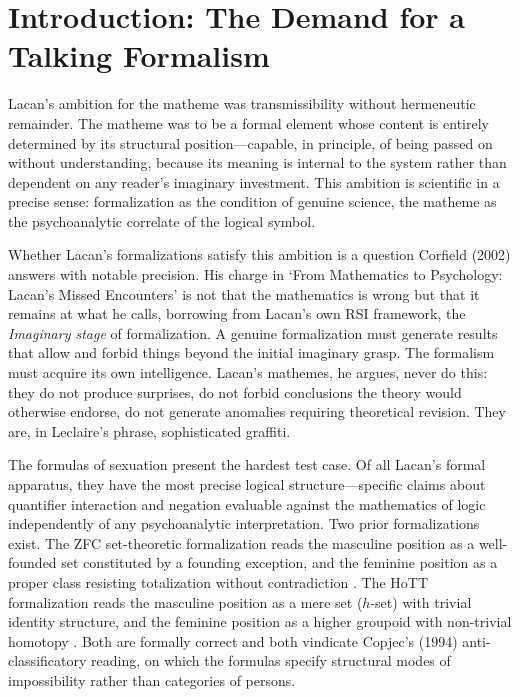 \documentclass[12pt]{article}
\theoremstyle{definition}
\theoremstyle{remark}
\begin{document}
\section{Introduction: The Demand for a Talking Formalism}

Lacan's ambition for the matheme was transmissibility without hermeneutic remainder. The matheme was to be a formal element whose content is entirely determined by its structural position---capable, in principle, of being passed on without understanding, because its meaning is internal to the system rather than dependent on any reader's imaginary investment. This ambition is scientific in a precise sense: formalization as the condition of genuine science, the matheme as the psychoanalytic correlate of the logical symbol.

Whether Lacan's formalizations satisfy this ambition is a question Corfield (2002) answers with notable precision. His charge in `From Mathematics to Psychology: Lacan's Missed Encounters' is not that the mathematics is wrong but that it remains at what he calls, borrowing from Lacan's own RSI framework, the \emph{Imaginary stage} of formalization. A genuine formalization must generate results that allow and forbid things beyond the initial imaginary grasp. The formalism must acquire its own intelligence. Lacan's mathemes, he argues, never do this: they do not produce surprises, do not forbid conclusions the theory would otherwise endorse, do not generate anomalies requiring theoretical revision. They are, in Leclaire's phrase, sophisticated graffiti.

The formulas of sexuation present the hardest test case. Of all Lacan's formal apparatus, they have the most precise logical structure---specific claims about quantifier interaction and negation evaluable against the mathematics of logic independently of any psychoanalytic interpretation. Two prior formalizations exist. The ZFC set-theoretic formalization reads the masculine position as a well-founded set constituted by a founding exception, and the feminine position as a proper class resisting totalization without contradiction \cite{papathanasiou2026a}. The HoTT formalization reads the masculine position as a mere set ($h$-set) with trivial identity structure, and the feminine position as a higher groupoid with non-trivial homotopy \cite{papathanasiou2026b}. Both are formally correct and both vindicate Copjec's (1994) anti-classificatory reading, on which the formulas specify structural modes of impossibility rather than categories of persons.
\end{document}
